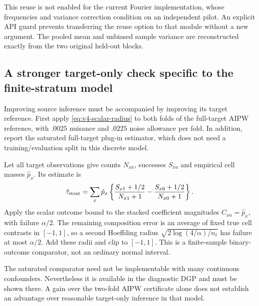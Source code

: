This reuse is not enabled for the current Fourier implementation, whose
frequencies and variance correction condition on an independent pilot.
An explicit API guard prevents transferring the reuse option to that module
without a new argument. The pooled mean and unbiased sample variance are
reconstructed exactly from the two original held-out blocks.

\subsection{A stronger target-only check specific to the finite-stratum model}

Improving source inference must be accompanied by improving its target
reference. First apply \eqref{eq:v4-scalar-radius} to both folds of the
full-target AIPW reference, with $.0025$ nuisance and $.0225$ noise allowance
per fold. In addition, report the saturated full-target plug-in estimator,
which does not need a training/evaluation split in this discrete model.

Let all target observations give counts $N_{xa}$, successes $S_{xa}$ and
empirical cell masses $\hat p_x$. Its estimate is
\[
 \hat\tau_{\rm strat}=\sum_x\hat p_x
 \left\{\frac{S_{x1}+1/2}{N_{x1}+1}
             -\frac{S_{x0}+1/2}{N_{x0}+1}\right\}.
\]
Apply the scalar outcome bound to the stacked coefficient magnitudes
$C_{xa}=\hat p_x$, with failure $\alpha/2$. The remaining composition
error is an average of fixed true cell contrasts in $[-1,1]$, so a second
Hoeffding radius $\sqrt{2\log(4/\alpha)/n_t}$ has failure at most
$\alpha/2$. Add these radii and clip to $[-1,1]$. This is a finite-sample
binary-outcome comparator, not an ordinary normal interval.

The saturated comparator need not be implementable with many continuous
confounders. Nevertheless it is available in the diagnostic DGP and must
be shown there. A gain over the two-fold AIPW certificate alone does not
establish an advantage over reasonable target-only inference in that model.
